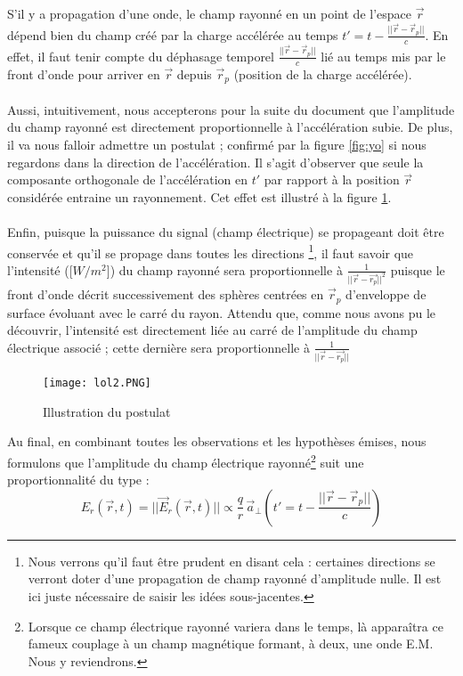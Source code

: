 S'il y a propagation d'une onde, le champ rayonné en un point de l'espace $\vec{r}$ dépend bien du champ créé par la charge accélérée au temps $t' = t - \frac{|| \vec{r} - \vec{r}_{p} ||}{c}$. En effet, il faut tenir compte du déphasage temporel $\frac{||\vec{r} - \vec{r}_{p} ||}{c}$ lié au temps mis par le front d'onde pour arriver en $\vec{r}$ depuis $\vec{r}_{p}$ (position de la charge accélérée). \\ \\
Aussi, intuitivement, nous accepterons pour la suite du document que l'amplitude du champ rayonné est directement proportionnelle à l'accélération subie. De plus, il va nous falloir admettre un postulat ; confirmé par la figure \ref{fig:yo} si nous regardons dans la direction de l'accélération. Il s'agit d'observer que seule la composante orthogonale de l'accélération en $t'$ par rapport à la position $\vec{r}$ considérée entraine un rayonnement. Cet effet est illustré à la figure \ref{fig:yo2}. \\ \\
Enfin, puisque la puissance du signal (champ électrique) se propageant doit être conservée et qu'il se propage dans toutes les directions \footnote{Nous verrons qu'il faut être prudent en disant cela : certaines directions se verront doter d'une propagation de champ rayonné d'amplitude nulle. Il est ici juste nécessaire de saisir les idées sous-jacentes.}, il faut savoir que l'intensité ([$W/m^{2}$]) du champ rayonné sera proportionnelle à $\frac{1}{|| \vec{r} - \vec{r_{p}} ||^{2} }$ 
puisque le front d'onde décrit successivement des sphères centrées en $\vec{r}_{p}$ d'enveloppe de surface évoluant avec le carré du rayon. Attendu que, comme nous avons pu le découvrir, l'intensité est directement liée au carré de l'amplitude du champ électrique associé ; cette dernière sera proportionnelle à $\frac{1}{||\vec{r} - \vec{r_{p}}||}$ 

\begin{figure}[h]
	\centering
	\texttt{[image: lol2.PNG]}
	\caption{Illustration du postulat}
	\label{fig:yo2}
\end{figure} 

Au final, en combinant toutes les observations et les hypothèses émises, nous formulons que l'amplitude du champ électrique  rayonné\footnote{Lorsque ce champ électrique rayonné variera dans le temps, là apparaîtra ce fameux couplage à un champ magnétique formant, à deux, une onde E.M. Nous y reviendrons.} suit une proportionnalité du type : 
\[ E_{r}(\vec{r},t) = || \vec{E}_{r}(\vec{r},t) || \propto \frac{q}{r}\,\vec{a}_{\perp}(t' = t - \frac{||\vec{r}-\vec{r}_{p}||}{c})\]

